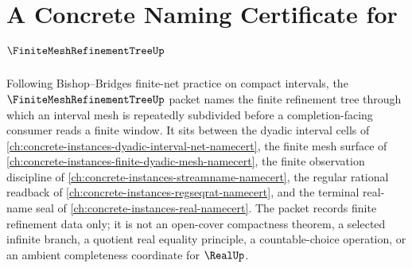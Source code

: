 \chapter{A Concrete Naming Certificate for $\FiniteMeshRefinementTreeUp$}
\label{ch:concrete-instances-finite-mesh-refinement-tree-namecert}

Following Bishop--Bridges finite-net practice on compact intervals, the $\FiniteMeshRefinementTreeUp$ packet names the finite refinement tree through which an interval mesh is repeatedly subdivided before a completion-facing consumer reads a finite window. It sits between the dyadic interval cells of \autoref{ch:concrete-instances-dyadic-interval-net-namecert}, the finite mesh surface of \autoref{ch:concrete-instances-finite-dyadic-mesh-namecert}, the finite observation discipline of \autoref{ch:concrete-instances-streamname-namecert}, the regular rational readback of \autoref{ch:concrete-instances-regseqrat-namecert}, and the terminal real-name seal of \autoref{ch:concrete-instances-real-namecert}. The packet records finite refinement data only; it is not an open-cover compactness theorem, a selected infinite branch, a quotient real equality principle, a countable-choice operation, or an ambient completeness coordinate for $\RealUp$.

